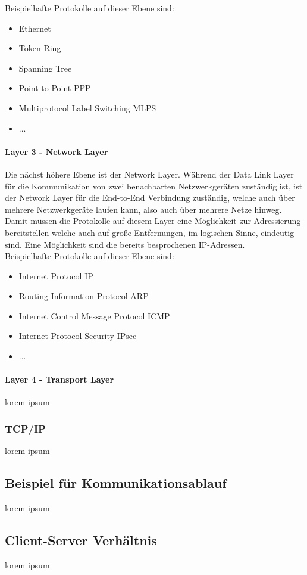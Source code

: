 \documentclass[12pt,a4paper]{report}
\begin{document}
Beispielhafte Protokolle auf dieser Ebene sind:
\begin{itemize}
\item Ethernet
\item Token Ring
\item Spanning Tree 
\item Point-to-Point PPP
\item Multiprotocol Label Switching MLPS
\item ...
\end{itemize}
\paragraph{Layer 3 - Network Layer}
Die nächst höhere Ebene ist der Network Layer. Während der Data Link Layer für die Kommunikation von zwei benachbarten Netzwerkgeräten zuständig ist, ist der Network Layer für die End-to-End Verbindung zuständig, welche auch über mehrere Netzwerkgeräte laufen kann, also auch über mehrere Netze hinweg. Damit müssen die Protokolle auf diesem Layer eine Möglichkeit zur Adressierung bereitstellen welche auch auf große Entfernungen, im logischen Sinne, eindeutig sind. Eine Möglichkeit sind die bereits besprochenen IP-Adressen.\\

Beispielhafte Protokolle auf dieser Ebene sind:
\begin{itemize}
\item Internet Protocol IP
\item Routing Information Protocol ARP
\item Internet Control Message Protocol ICMP
\item Internet Protocol Security IPsec
\item ...
\end{itemize}

\paragraph{Layer 4 - Transport Layer}
lorem ipsum
\subsubsection{TCP/IP}\label{sssec:tcpip}
lorem ipsum
\subsection{Beispiel für Kommunikationsablauf}
lorem ipsum
\subsection{Client-Server Verhältnis}
lorem ipsum
\end{document}
